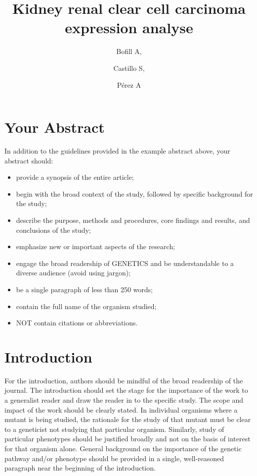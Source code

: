 \documentclass[9pt,twocolumn,twoside]{gsajnl}
\title{Kidney renal clear cell carcinoma expression analyse}
\author[$\ast$1]{Bofill A,}
\author[$\ast$1]{Castillo S,}
\author[$\ast$1]{Pérez A}
\affil[$\ast$]{Msc in Bioinformatics for Health Sciences, Pompeu Fabra University}
\begin{document}
\maketitle
\thispagestyle{firststyle}
\marginmark
\firstpagefootnote
{}
\vspace{-11pt}%

\section*{Your Abstract}

In addition to the guidelines provided in the example abstract above, your abstract should:
\begin{itemize}
\item provide a synopsis of the entire article;
\item begin with the broad context of the study, followed by specific background for the study;
\item describe the purpose, methods and procedures, core findings and results, and conclusions of the study;
\item emphasize new or important aspects of the research;
\item engage the broad readership of GENETICS and be understandable to a diverse audience (avoid using jargon);
\item be a single paragraph of less than 250 words;
\item contain the full name of the organism studied;
\item NOT contain citations or abbreviations.
\end{itemize}

\section*{Introduction}

For the introduction, authors should be mindful of the broad readership of the journal. The introduction should set the stage for the importance of the work to a generalist reader and draw the reader in to the specific study. The scope and impact of the work should be clearly stated. In individual organisms where a mutant is being studied, the rationale for the study of that mutant must be clear to a geneticist not studying that particular organism. Similarly, study of particular phenotypes should be justified broadly and not on the basis of interest for that organism alone. General background on the importance of the genetic pathway and/or phenotype should be provided in a single, well-reasoned paragraph near the beginning of the introduction.
\end{document}
